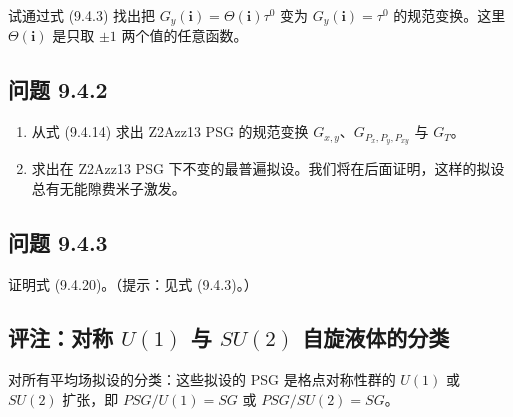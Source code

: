 试通过式 (9.4.3) 找出把 $G_{y}(\pmb{i})=\Theta(\pmb{i})\tau^{0}$ 变为 $G_{y}(\pmb{i})=\tau^{0}$ 的规范变换。这里 $\Theta(\pmb{i})$ 是只取 $\pm1$ 两个值的任意函数。

\subsection*{问题 9.4.2}

\begin{enumerate}
\item 从式 (9.4.14) 求出 Z2Azz13 PSG 的规范变换 $G_{x,y}$、$G_{P_{x},P_{y},P_{xy}}$ 与 $G_{T}$。
\item 求出在 Z2Azz13 PSG 下不变的最普遍拟设。我们将在后面证明，这样的拟设总有无能隙费米子激发。
\end{enumerate}

\subsection*{问题 9.4.3}

证明式 (9.4.20)。（提示：见式 (9.4.3)。）

\subsection{评注：对称 $U(1)$ 与 $SU(2)$ 自旋液体的分类}

\begin{keypoints}
\item 对所有平均场拟设的分类：这些拟设的 PSG 是格点对称性群的 $U(1)$ 或 $SU(2)$ 扩张，即 $PSG/U(1)=SG$ 或 $PSG/SU(2)=SG$。
\end{keypoints}

